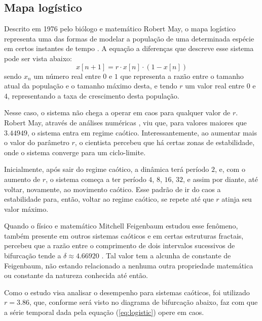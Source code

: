 \documentclass[a4paper, 12pt]{article}
\begin{document}
\subsection{Mapa logístico}

Descrito em 1976 pelo biólogo e matemático Robert May, o mapa logístico representa uma das formas de modelar a população de uma determinada espécie em certos instantes de tempo \cite{may1976simple}. A equação a diferenças que descreve esse sistema pode ser vista abaixo:
\begin{equation}\label{eq:logistic}
x[n+1] = r\cdot x[n] \cdot (1 - x[n])
\end{equation}
sendo $x_n$ um número real entre $0$ e $1$ que representa a razão entre o tamanho atual da população e o tamanho máximo desta, e tendo $r$ um valor real entre $0$ e $4$, representando a taxa de crescimento desta população.

Nesse caso, o sistema não chega a operar em caos para qualquer valor de $r$. Robert May, através de análises numéricas \cite{fiedler1994caos}, viu que, para valores maiores que $3.44949$, o sistema entra em regime caótico. Interessantemente, ao aumentar mais o valor do parâmetro $r$, o cientista percebeu que há certas zonas de estabilidade, onde o sistema converge para um ciclo-limite. 

Inicialmente, após sair do regime caótico, a dinâmica terá período $2$, e, com o aumento de $r$, o sistema começa a ter período $4$, $8$, $16$, $32$, e assim por diante, até voltar, novamente, ao movimento caótico. Esse padrão de ir do caos a estabilidade para, então, voltar ao regime caótico, se repete até que $r$ atinja seu valor máximo.

Quando o físico e matemático Mitchell Feigenbaum estudou esse fenômeno, também presente em outros sistemas caóticos e em certas estruturas fractais, percebeu que a razão entre o comprimento de dois intervalos sucessivos de bifurcação tende a $\delta \approx 4.66920$ \cite{feigenbaum1978quantitative}. Tal valor tem a alcunha de constante de Feigenbaum, não estando relacionado a nenhuma outra propriedade matemática ou constante da natureza conhecida até então.

Como o estudo visa analisar o desempenho para sistemas caóticos, foi utilizado $r=3.86$, que, conforme será visto no diagrama de bifurcação abaixo, faz com que a série temporal dada pela equação (\ref{eq:logistic}) opere em caos. 
\end{document}
